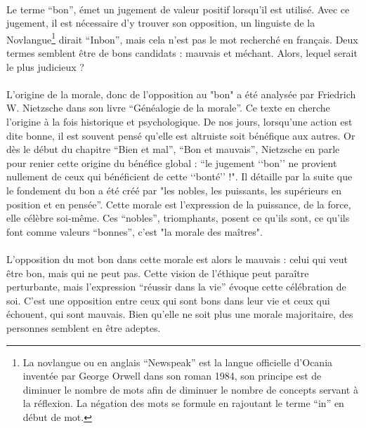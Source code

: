 \documentclass[10pt, french, a4paper]{report}
\begin{document}
\paragraph{}
Le terme ``bon'', émet un jugement de valeur positif lorsqu’il est utilisé. Avec ce jugement, il est nécessaire d’y trouver son opposition, un linguiste de la Novlangue\footnote{La novlangue ou en anglais ``Newspeak'' est la langue officielle d’Ocania inventée par George Orwell dans son roman 1984, son principe est de diminuer le nombre de mots afin de diminuer le nombre de concepts servant à la réflexion. La négation des mots se formule en rajoutant le terme ``in'' en début de mot.} dirait ``Inbon'', mais cela n’est pas le mot recherché en français. Deux termes semblent être de bons candidats : mauvais et méchant. Alors, lequel serait le plus judicieux ?

\paragraph{}
L’origine de la morale, donc de l’opposition au "bon" a été analysée par Friedrich W. Nietzsche \citep{nietzsche_genealogie_1900} dans son livre ``Généalogie de la morale''. Ce texte en cherche l’origine à la fois historique et psychologique. De nos jours, lorsqu’une action est dite bonne, il est souvent pensé qu’elle est altruiste soit bénéfique aux autres. Or dès le début du chapitre ``Bien et mal'', ``Bon et mauvais'', Nietzsche en parle pour renier cette origine du bénéfice global : ``le jugement ‘‘bon’’ ne provient nullement de ceux qui bénéficient de cette ‘‘bonté’’ !". Il détaille par la suite que le fondement du bon a été créé par "les nobles, les puissants, les supérieurs en position et en pensée''. Cette morale est l’expression de la puissance, de la force, elle célèbre soi-même. Ces ``nobles'', triomphants, posent ce qu’ils sont, ce qu’ils font comme valeurs ``bonnes'', c’est "la morale des maîtres".

\paragraph{}
L’opposition du mot bon dans cette morale est alors le mauvais : celui qui veut être bon, mais qui ne peut pas. Cette vision de l’éthique peut paraître perturbante, mais l’expression ``réussir dans la vie'' évoque cette célébration de soi. C'est une opposition entre ceux qui sont bons dans leur vie et ceux qui échouent, qui sont mauvais. Bien qu’elle ne soit plus une morale majoritaire, des personnes semblent en être adeptes.
\end{document}
